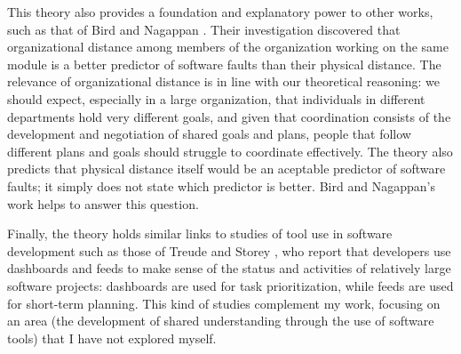 This theory also provides a foundation and explanatory power to other works, such as that of Bird and Nagappan . Their investigation discovered that organizational distance among members of the organization working on the same module is a better predictor of software faults than their physical distance. The relevance of organizational distance is in line with our theoretical reasoning: we should expect, especially in a large organization, that individuals in different departments hold very different goals, and given that coordination consists of the development and negotiation of shared goals and plans, people that follow different plans and goals should struggle to coordinate effectively. The theory also predicts that physical distance itself would be an aceptable predictor of software faults; it simply does not state which predictor is better. Bird and Nagappan's work helps to answer this question.

Finally, the theory holds similar links to studies of tool use in software development such as those of Treude and Storey , who report that developers use dashboards and feeds to make sense of the status and activities of relatively large software projects: dashboards are used for task prioritization, while feeds are used for short-term planning. This kind of studies complement my work, focusing on an area (the development of shared understanding through the use of software tools) that I have not explored myself.
